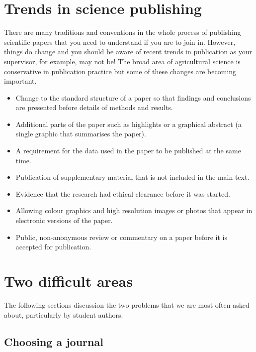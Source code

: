 \documentclass[
  titlepage]{book}
\begin{document}
\hypertarget{trends-in-science-publishing}{%
\section{Trends in science publishing}\label{trends-in-science-publishing}}

There are many traditions and conventions in the whole process of publishing scientific papers that you need to understand if you are to join in. However, things do change and you should be aware of recent trends in publication as your supervisor, for example, may not be! The broad area of agricultural science is conservative in publication practice but some of these changes are becoming important.

\begin{itemize}
\item
  Change to the standard structure of a paper so that findings and conclusions are presented before details of methods and results.
\item
  Additional parts of the paper such as highlights or a graphical abstract (a single graphic that summarises the paper).
\item
  A requirement for the data used in the paper to be published at the same time.
\item
  Publication of supplementary material that is not included in the main text.
\item
  Evidence that the research had ethical clearance before it was started.
\item
  Allowing colour graphics and high resolution images or photos that appear in electronic versions of the paper.
\item
  Public, non-anonymous review or commentary on a paper before it is accepted for publication.
\end{itemize}

\hypertarget{two-difficult-areas}{%
\section{Two difficult areas}\label{two-difficult-areas}}

The following sections discussion the two problems that we are most often asked about, particularly by student authors.

\hypertarget{choosing-a-journal}{%
\subsection{Choosing a journal}\label{choosing-a-journal}}
\end{document}
